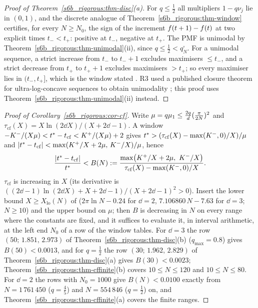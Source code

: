 \begin{proof}[Proof of Theorem~\ref{s6b_rigorous:thm-disc}(a)]
 For $q\le\frac12$ all multipliers $1-q\nu_j$ lie in $(0,1)$, and the discrete analogue of
Theorem~\ref{s6b_rigorous:thm-window}  certifies, for every $N\ge N_0$, the sign
of the increment $f(t+1)-f(t)$ at two explicit times $t_-<t_+$: positive at $t_-$, negative at $t_+$. The PMF is
unimodal by Theorem~\ref{s6b_rigorous:thm-unimodal}(ii), since $q\le\frac12<q_N^{\square}$. For a unimodal sequence, a
strict increase from $t_-$ to $t_-+1$ excludes maximisers $\le t_-$, and a strict decrease from $t_+$ to $t_++1$
excludes maximisers $>t_+$; so every maximiser lies in $(t_-,t_+]$, which is the window stated
. R3 used a published closure theorem for ultra-log-concave sequences to obtain unimodality
; this proof uses Theorem~\ref{s6b_rigorous:thm-unimodal}(ii) instead.
\end{proof}

\begin{proof}[Proof of Corollary~\ref{s6b_rigorous:cor-cf}]
 Write $\mu=q\mu_{1}\le\frac{2q}{d}(\frac\pi{2N})^{2}$ and $\tau_{\mathrm{cf}}(X)=X\ln(2\dd X)/(X+2\dd-1)$. A
window $-K^{-}/(X\mu)<t^{*}-t_{\mathrm{cf}}<K^{+}/(X\mu)+2$ gives $t^{*}>(\tau_{\mathrm{cf}}(X)-\max(K^{-},0)/X)/\mu$ and
$|t^{*}-t_{\mathrm{cf}}|<\max(K^{+}/X+2\mu,\,K^{-}/X)/\mu$, hence
\[
\frac{|\tmode-\tcf|}{\tmode}<B(N):=\frac{\max\bigl(K^{+}/X+2\mu,\ K^{-}/X\bigr)}{\tau_{\mathrm{cf}}(X)-\max(K^{-},0)/X}.
\]
$\tau_{\mathrm{cf}}$ is increasing in $X$ (its derivative is $((2\dd-1)\ln(2\dd X)+X+2\dd-1)/(X+2\dd-1)^{2}>0$). Insert the
lower bound $X\ge X_{\mathrm{lo}}(N)$ of  ($2\pi\ln N-0.24$ for $\dd=2$, $7.106860\,N-7.63$ for
$\dd=3$; $N\ge10$) and the upper bound on $\mu$; then $B$ is decreasing in $N$ on every range where the constants
are fixed, and it suffices to evaluate it, in interval arithmetic, at the left end $N_0$ of a row of the window tables.
For $\dd=3$ the row $(50;\,1.851,\,2.973)$ of Theorem~\ref{s6b_rigorous:thm-disc}(b) ($q_{\max}=0.8$) gives
$B(50)<0.0013$, and for $q=\frac12$ the row $(30;\,1.962,\,2.829)$ of Theorem~\ref{s6b_rigorous:thm-disc}(a) gives
$B(30)<0.0023$; Theorem~\ref{s6b_rigorous:thm-cffinite}(b) covers $10\le N\le120$ and $10\le N\le80$. For $\dd=2$ the
rows with $N_0=1000$ give $B(N)<0.0100$ exactly from $N=1\,761\,450$ ($q=\frac45$) and $N=554\,846$ ($q=\frac12$) on,
and Theorem~\ref{s6b_rigorous:thm-cffinite}(a) covers the finite ranges.
\end{proof}

